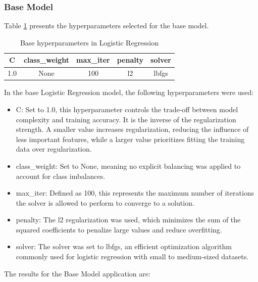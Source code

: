 \subsubsection{Base Model}
Table \ref{tab:tab1} presents the hyperparameters selected for the base model.

\begin{table}[ht]
    \centering
    \caption{Base hyperparameters in Logistic Regression} 
    \begin{tabular}{||c c c c c||} 
     \hline
     C & class\_weight & max\_iter & penalty & solver \\ [0.5ex] 
     \hline\hline
     1.0 & None & 100 & l2 & lbfgs \\ 
    \hline
    \end{tabular}
    \label{tab:tab1}
\end{table}

In the base Logistic Regression model, the following hyperparameters were used:

\begin{itemize}
    \item C: Set to 1.0, this hyperparameter controls the trade-off between model complexity and training accuracy. It is the inverse of the regularization strength. A smaller value increases regularization, reducing the influence of less important features, while a larger value prioritizes fitting the training data over regularization.
    \item class\_weight: Set to None, meaning no explicit balancing was applied to account for class imbalances.
    \item max\_iter: Defined as 100, this represents the maximum number of iterations the solver is allowed to perform to converge to a solution.
    \item penalty: The l2 regularization was used, which minimizes the sum of the squared coefficients to penalize large values and reduce overfitting.
    \item solver: The solver was set to lbfgs, an efficient optimization algorithm commonly used for logistic regression with small to medium-sized datasets.
\end{itemize}

The results for the Base Model application are:

